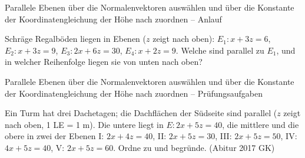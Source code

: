 \begin{aufgabe}{Parallele Ebenen über die Normalenvektoren auswählen und über die Konstante der Koordinatengleichung der Höhe nach zuordnen – Anlauf}
\begin{teile}
\teil Schräge Regalböden liegen in Ebenen ($z$ zeigt nach oben): $E_1\colon x + 3z = 6$, $E_2\colon x + 3z = 9$, $E_3\colon 2x + 6z = 30$, $E_4\colon x + 2z = 9$. Welche sind parallel zu $E_1$, und in welcher Reihenfolge liegen sie von unten nach oben?
\end{teile}
\end{aufgabe}

\begin{aufgabe}{Parallele Ebenen über die Normalenvektoren auswählen und über die Konstante der Koordinatengleichung der Höhe nach zuordnen – Prüfungsaufgaben}
\begin{teile}
\teil Ein Turm hat drei Dachetagen; die Dachflächen der Südseite sind parallel ($z$ zeigt nach oben, 1 LE = 1 m). Die untere liegt in $E\colon 2x + 5z = 40$, die mittlere und die obere in zwei der Ebenen I: $2x + 4z = 40$, II: $2x + 5z = 30$, III: $2x + 5z = 50$, IV: $4x + 5z = 40$, V: $2x + 5z = 60$. Ordne zu und begründe. \hfill (Abitur 2017 GK)
\end{teile}
\end{aufgabe}
